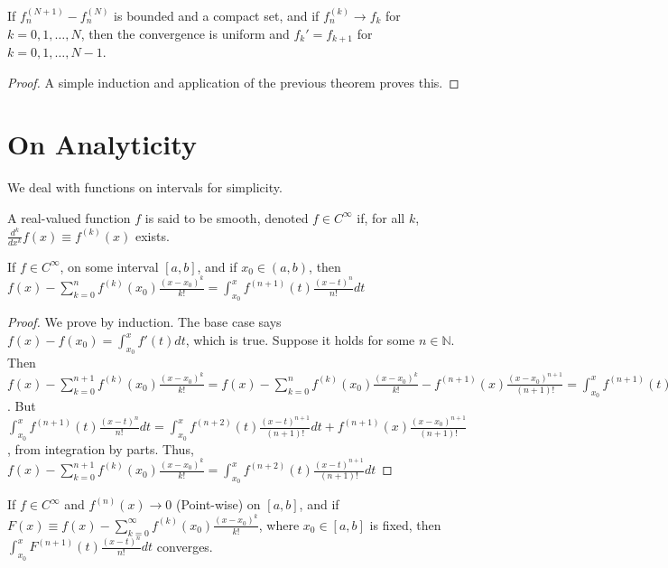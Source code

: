 \documentclass[crop=false,class=book,oneside]{standalone}
\begin{document}
            \begin{corollary}
                If $f_n^{(N+1)}-f_n^{(N)}$ is bounded and a compact set, and if $f_n^{(k)}\rightarrow f_k$ for $k=0,1,\hdots, N$, then the convergence is uniform and $f_{k}' = f_{k+1}$ for $k=0,1,\hdots,N-1$.
            \end{corollary}
            \begin{proof}
                A simple induction and application of the previous theorem proves this.
            \end{proof}
        \section{On Analyticity}
            We deal with functions on intervals for simplicity.
            \begin{definition}
                A real-valued function $f$ is said to be smooth, denoted $f\in C^{\infty}$ if, for all $k$, $\frac{d^k}{dx^k}f(x) \equiv f^{(k)}(x)$ exists.
            \end{definition}
        \begin{theorem}
        If $f\in C^{\infty}$, on some interval $[a,b]$, and if $x_0\in (a,b)$, then $f(x) - \sum_{k=0}^{n} f^{(k)}(x_0)\frac{(x-x_0)^k}{k!} = \int_{x_0}^{x} f^{(n+1)}(t)\frac{(x-t)^n}{n!}dt$
        \end{theorem}
        \begin{proof}
        We prove by induction. The base case says $f(x)-f(x_0) = \int_{x_0}^{x} f'(t)dt$, which is true. Suppose it holds for some $n\in \mathbb{N}$. Then $f(x)-\sum_{k=0}^{n+1} f^{(k)}(x_0)\frac{(x-x_0)^k}{k!} = f(x)-\sum_{k=0}^{n} f^{(k)}(x_0)\frac{(x-x_0)^k}{k!} - f^{(n+1)}(x)\frac{(x-x_0)^{n+1}}{(n+1)!} = \int_{x_0}^{x} f^{(n+1)}(t)\frac{(x-t)^n}{n!}dt - f^{(n+1)}(x)\frac{(x-x_0)^{n+1}}{(n+1)!}$. But $\int_{x_0}^{x} f^{(n+1)}(t)\frac{(x-t)^n}{n!}dt =  \int_{x_0}^{x} f^{(n+2)}(t) \frac{(x-t)^{n+1}}{(n+1)!} dt + f^{(n+1)}(x)\frac{(x-x_0)^{n+1}}{(n+1)!}$, from integration by parts. Thus, $f(x)-\sum_{k=0}^{n+1} f^{(k)}(x_0)\frac{(x-x_0)^k}{k!}= \int_{x_0}^{x} f^{(n+2)}(t) \frac{(x-t)^{n+1}}{(n+1)!} dt$
        \end{proof}
        \begin{lemma}
        If $f\in C^{\infty}$ and $f^{(n)}(x)\rightarrow 0$ (Point-wise) on $[a,b]$, and if $F(x) \equiv f(x)-\sum_{k=0}^{\infty} f^{(k)}(x_0)\frac{(x-x_0)^{k}}{k!}$, where $x_0\in [a,b]$ is fixed, then $\int_{x_0}^{x} F^{(n+1)}(t)\frac{(x-t)^{n}}{n!}dt$ converges. 
        \end{lemma}
\end{document}
